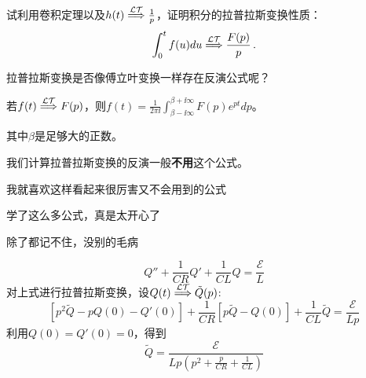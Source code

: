 \documentclass[CJK]{beamer}
\begin{document}
\begin{frame}
  \bch


    试利用卷积定理以及$h(t) \stackrel{\mathcal{LT}}{\Longrightarrow} \frac{1}{p}$，证明积分的拉普拉斯变换性质：
    $$ \int_0^t f(u) du \stackrel{\mathcal{LT}}{\Longrightarrow} \frac{F(p)}{p} \, . $$
  \ech
\end{frame}

\begin{frame}
  \bch

{\Large 拉普拉斯变换是否像傅立叶变换一样存在反演公式呢？}
  \ech
\end{frame}

\begin{frame}
  \bch
      {\blue 若$f(t) \stackrel{\mathcal{LT}}{\Longrightarrow} F(p)$，则$f(t) = \frac{1}{2\pi \ii} \int_{\beta-\ii\infty}^{\beta+\ii \infty}F(p)e^{pt}dp$}。
      
      其中$\beta$是足够大的正数。

      \skipline
      
      我们计算拉普拉斯变换的反演一般{\bf 不用}这个公式。

      \skipline
      
      \bcenter
      
      我就喜欢这样看起来很厉害又不会用到的公式
      \ecenter
  \ech
\end{frame}

\begin{frame}
  \bch
  \bcenter
  学了这么多公式，真是太开心了


  除了都记不住，没别的毛病
  \ecenter
  \ech
\end{frame}


\begin{frame}
  \bch
  
  \ech
\end{frame}


\begin{frame}
  \bch
  $$Q''+ \frac{1}{CR} Q' +  \frac{1}{CL}Q = \frac{\mathcal{E}}{L} $$  
  对上式进行拉普拉斯变换，设$Q(t) \stackrel{\mathcal{LT}}{\Longrightarrow} \tilde{Q}(p)$:
  $$ \left[p^2 \tilde{Q} - pQ(0) - Q'(0)\right] + \frac{1}{CR} \left[p\tilde{Q} - Q(0)\right] + \frac{1}{CL} \tilde{Q} = \frac{\mathcal{E}}{L p } $$
  利用$Q(0) = Q'(0) = 0$，得到
  $$  \tilde{Q} = \frac{\mathcal{E}}{Lp\left(p^2+\frac{p}{CR} + \frac{1}{CL}\right)} $$
  \ech
\end{frame}
\end{document}
